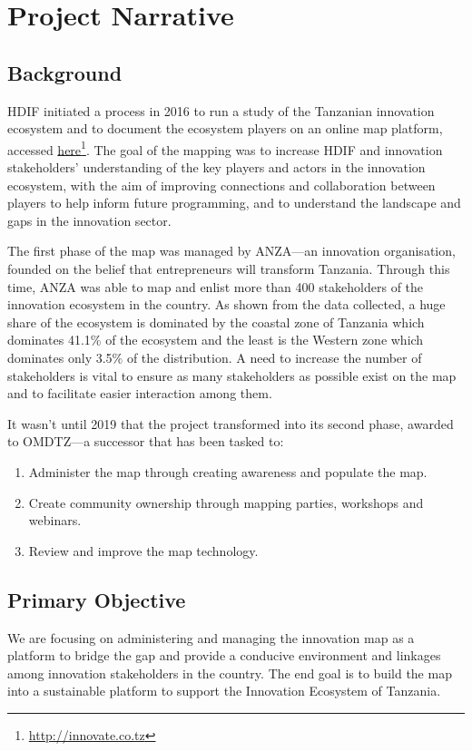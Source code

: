 \documentclass[a4paper,12pt,twoside]{article}
\begin{document}
\newpage
\section{Project Narrative}
\subsection{Background}
HDIF initiated a process in 2016 to run a study of the Tanzanian innovation ecosystem and to document the ecosystem players on an online map platform, accessed \href{http://innovate.co.tz}{here}\footnote{\url{http://innovate.co.tz}}. The goal of the mapping was to increase HDIF and innovation stakeholders’ understanding of the key players and actors in the innovation ecosystem, with the aim of improving connections and collaboration between players to help inform future programming, and to understand the landscape and gaps in the innovation sector.
\medskip

The first phase of the map was managed by ANZA---an innovation organisation, founded on the belief that entrepreneurs will transform Tanzania. Through this time, ANZA was able to map and enlist more than 400 stakeholders of the innovation ecosystem in the country. As shown from the data collected, a huge share of the ecosystem is dominated by the coastal zone of Tanzania which dominates 41.1\% of the ecosystem and the least is the Western zone which dominates only 3.5\% of the distribution. A need to increase the number of stakeholders is vital to ensure as many stakeholders as possible exist on the map and to facilitate easier interaction among them.
\medskip

It wasn’t until 2019 that the project transformed into its second phase, awarded to OMDTZ---a successor that has been tasked to:
{\renewcommand{\theenumi}{\roman{enumi}}%
\begin{enumerate}
    \item Administer the map through creating awareness and populate the map.
    \item Create community ownership through mapping parties, workshops and webinars.
    \item Review and improve the map technology. 
\end{enumerate}}

\subsection{Primary Objective}
We are focusing on administering and managing the innovation map as a platform to bridge the gap and provide a conducive environment and linkages among innovation stakeholders in the country. The end goal is to build the map into a sustainable platform to support the Innovation Ecosystem of Tanzania.
\end{document}
